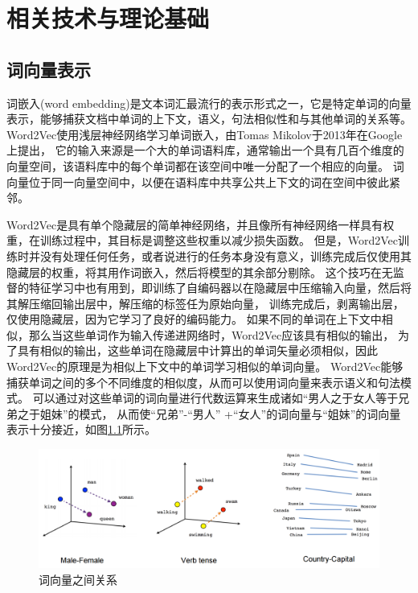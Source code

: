 \chapter{相关技术与理论基础}

\section{词向量表示}

词嵌入(word embedding)是文本词汇最流行的表示形式之一，它是特定单词的向量表示，能够捕获文档中单词的上下文，语义，句法相似性和与其他单词的关系等。
Word2Vec使用浅层神经网络学习单词嵌入，由Tomas Mikolov于2013年在Google上提出\cite{mikolov2013distributed}，
它的输入来源是一个大的单词语料库，通常输出一个具有几百个维度的向量空间，该语料库中的每个单词都在该空间中唯一分配了一个相应的向量。 
词向量位于同一向量空间中，以便在语料库中共享公共上下文的词在空间中彼此紧邻。 

  Word2Vec是具有单个隐藏层的简单神经网络，并且像所有神经网络一样具有权重，在训练过程中，其目标是调整这些权重以减少损失函数。 
  但是，Word2Vec训练时并没有处理任何任务，或者说进行的任务本身没有意义，训练完成后仅使用其隐藏层的权重，将其用作词嵌入，然后将模型的其余部分剔除。
  这个技巧在无监督的特征学习中也有用到，即训练了自编码器以在隐藏层中压缩输入向量，然后将其解压缩回输出层中，解压缩的标签任为原始向量，
  训练完成后，剥离输出层，仅使用隐藏层，因为它学习了良好的编码能力。
  如果不同的单词在上下文中相似，那么当这些单词作为输入传递进网络时，Word2Vec应该具有相似的输出，
  为了具有相似的输出，这些单词在隐藏层中计算出的单词矢量必须相似，因此Word2Vec的原理是为相似上下文中的单词学习相似的单词向量。
Word2Vec能够捕获单词之间的多个不同维度的相似度，从而可以使用词向量来表示语义和句法模式。
可以通过对这些单词的词向量进行代数运算来生成诸如“男人之于女人等于兄弟之于姐妹”的模式，
从而使“兄弟”-“男人” +“女人”的词向量与“姐妹”的词向量表示十分接近，如图\ref{fig:linear-relationships}所示。


\begin{figure}[htbp]
  \centering
  \includegraphics[scale=0.5]{./images/linear-relationships.jpg}
  \caption{词向量之间关系\cite{mikolov2013distributed}}
  \label{fig:linear-relationships}
\end{figure}



